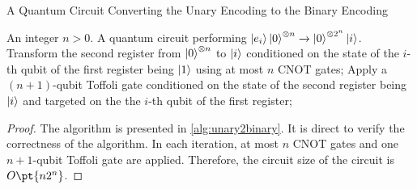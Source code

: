 \documentclass[a4paper,UKenglish,cleveref, autoref, thm-restate]{lipics-v2021}
\newcommand{\bo}{O\pt}
\begin{document}
\begin{algorithm}[htbp]
    \caption{A Quantum Circuit Converting the Unary Encoding to the Binary Encoding}\label{alg:unary2binary} 
    \begin{algorithmic}[1]
    \REQUIRE An integer $n > 0$.
    \ENSURE A quantum circuit performing $\ket{e_i}\ket{0}^{\otimes n} \xrightarrow{} \ket{0}^{\otimes 2^n} \ket{i}$.
    \STATE Transform the second register from $\ket{0}^{\otimes n}$ to $\ket{i}$ conditioned on the state of the $i$-th qubit of the first register being $\ket{1}$ using at most $n$ CNOT gates;
    \STATE Apply a $(n+1)$-qubit Toffoli gate conditioned on the state of the second register being $\ket{i}$ and targeted on the  the $i$-th qubit of the first register;
    \ENDFOR
    \end{algorithmic}
\end{algorithm}

\begin{proof}
    The algorithm is presented in \cref{alg:unary2binary}. It is direct to verify the correctness of the algorithm. In each iteration, at most $n$ CNOT gates and one $n+1$-qubit Toffoli gate are applied. Therefore, the circuit size of the circuit is $\bo{n2^n}$.
\end{proof}
\end{document}
